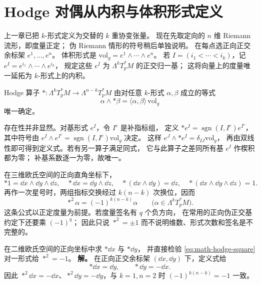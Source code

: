\section{Hodge 对偶从内积与体积形式定义}

上一章已把 \(k\)-形式定义为交替的 \(k\) 重协变张量。
现在先取定向的 \(n\) 维 Riemann 流形，即度量正定；
伪 Riemann 情形的符号稍后单独说明。
在每点选正向正交余标架 \(e^1,\ldots,e^n\)。
体积形式是
\(\mathrm{vol}_g=e^1\wedge\cdots\wedge e^n\)。
若 \(I=(i_1<\cdots<i_k)\)，记
\(e^I=e^{i_1}\wedge\cdots\wedge e^{i_k}\)，
规定这些 \(e^I\) 为 \(\Lambda^kT_p^*M\) 的正交归一基；
这将向量上的度量唯一延拓为 \(k\)-形式上的内积。

\begin{definition}[Hodge 星号]
Hodge 算子 \(*:\Lambda^kT_p^*M\to\Lambda^{n-k}T_p^*M\)
由对任意 \(k\)-形式 \(\alpha,\beta\) 成立的等式
\[
\alpha\wedge *\beta
=\langle\alpha,\beta\rangle\,\mathrm{vol}_g
\]
唯一确定。
\end{definition}

存在性并非显然。对基形式 \(e^I\)，令 \(I^c\) 是补指标组，
定义 \(*e^I=\operatorname{sgn}(I,I^c)e^{I^c}\)，
其中符号由
\(e^I\wedge e^{I^c}
=\operatorname{sgn}(I,I^c)\mathrm{vol}_g\) 决定。
这样 \(e^J\wedge *e^I=\delta_{IJ}\mathrm{vol}_g\)，
再由双线性即可得到定义式。若有另一算子满足同式，
它与此算子之差同所有基 \(e^I\) 作楔积都为零；
补基系数逐一为零，故唯一。

在三维欧氏空间的正向直角坐标下，
\[
*1=\dd x\wedge\dd y\wedge\dd z,
\quad *\dd x=\dd y\wedge\dd z,
\quad *(\dd x\wedge\dd y)=\dd z,
\quad *(\dd x\wedge\dd y\wedge\dd z)=1.
\]
再作一次星号时，两组指标交换经过 \(k(n-k)\) 次换位，因而
\begin{equation}
*^2\alpha=(-1)^{k(n-k)}\alpha
\qquad\bigl(\alpha\in\Lambda^kT_p^*M\bigr).
\label{eq:math-hodge-square}
\end{equation}
这条公式以正定度量为前提。若度量签名有 \(q\) 个负方向，
在常用的正向伪正交基约定下还要乘 \((-1)^q\)；
因此只说 \(*^2=\pm1\) 而不说明维数、形式次数和签名是不完整的。


\par
\begin{workedexample}
在二维欧氏空间的正向坐标中求 \(*\dd x\) 与 \(*\dd y\)，
并直接检验 \cref{eq:math-hodge-square} 对一形式给 \(*^2=-1\)。
\textbf{解。} 在正向正交余标架 \((\dd x,\dd y)\) 下，定义式给
\[
*\dd x=\dd y,\qquad *\dd y=-\dd x.
\]
因此 \(*^2\dd x=-\dd x\)、\(*^2\dd y=-\dd y\)，与 \(k=1,n=2\) 时 \((-1)^{k(n-k)}=-1\) 一致。
\end{workedexample}
\par
